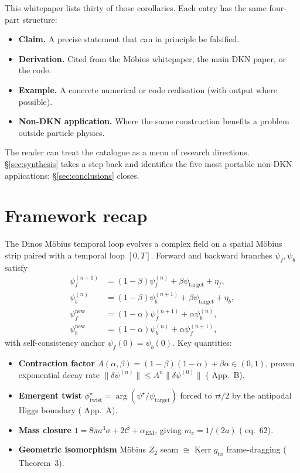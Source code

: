 \documentclass[11pt,a4paper]{article}
\theoremstyle{definition}
\newcommand{\psif}{\psi_{f}}
\newcommand{\psib}{\psi_{b}}
\newcommand{\psit}{\psi_{\mathrm{target}}}
\newcommand{\phitwist}{\phi_{\mathrm{twist}}}
\newcommand{\contr}{A}
\begin{document}
This whitepaper lists thirty of those corollaries. Each entry has the
same four-part structure:
\begin{itemize}[leftmargin=1.4em,itemsep=0.15em]
  \item \textbf{Claim.} A precise statement that can in principle be
    falsified.
  \item \textbf{Derivation.} Cited from the M\"obius whitepaper,
    the main DKN paper, or the code.
  \item \textbf{Example.} A concrete numerical or code realisation
    (with output where possible).
  \item \textbf{Non-DKN application.} Where the same construction
    benefits a problem outside particle physics.
\end{itemize}
The reader can treat the catalogue as a menu of research directions.
\S\ref{sec:synthesis} takes a step back and identifies the five
most portable non-DKN applications; \S\ref{sec:conclusions} closes.

\section{Framework recap}\label{sec:recap}

The Dinos M\"obius temporal loop evolves a complex field on a spatial
M\"obius strip paired with a temporal loop $[0, T]$. Forward and
backward branches $\psif, \psib$ satisfy
\begin{align}
  \psif^{(n+1)} &= (1-\beta)\psif^{(n)} + \beta \psit + \eta_f,
    \tag{F}\label{eq:fwd}\\
  \psib^{(n)}   &= (1-\beta)\psib^{(n+1)} + \beta \psit + \eta_b,
    \tag{B}\label{eq:bwd}\\
  \psif^{\mathrm{new}} &= (1-\alpha)\psif^{(n+1)} + \alpha \psib^{(n)},
    \tag{P$_f$}\label{eq:prof}\\
  \psib^{\mathrm{new}} &= (1-\alpha)\psib^{(n)} + \alpha \psif^{(n+1)},
    \tag{P$_b$}\label{eq:prob}
\end{align}
with self-consistency anchor $\psif(0) = \psib(0)$. Key quantities:
\begin{itemize}[leftmargin=1.4em,itemsep=0.1em]
  \item \textbf{Contraction factor}
    $\contr(\alpha,\beta) = (1-\beta)(1-\alpha) + \beta\alpha \in (0,1)$,
    proven exponential decay rate
    $\|\delta\psi^{(n)}\| \le \contr^n\|\delta\psi^{(0)}\|$
    (\cite{Knopp2026TemporalLoop} App.~B).
  \item \textbf{Emergent twist}
    $\phitwist^\star = \arg(\psi^\star / \psit)$ forced to $\tau t/2$
    by the antipodal Higgs boundary
    (\cite{Knopp2026TemporalLoop} App.~A).
  \item \textbf{Mass closure}
    $1 = 8\pi a^3\sigma + 2\mathcal{C} + \alpha_{\mathrm{EM}}$,
    giving $m_e = 1/(2a)$ (\cite{Knopp2026} eq.~62).
  \item \textbf{Geometric isomorphism}
    M\"obius $Z_2$ seam $\cong$ Kerr $g_{t\phi}$ frame-dragging
    (\cite{Knopp2026TemporalLoop} Theorem~3).
\end{itemize}
\end{document}
